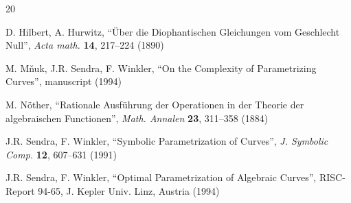 \begin{thebibliography}{20}

      D. Hilbert, A. Hurwitz, ``\"Uber die Diophantischen
Gleichungen vom Geschlecht Null'', {\it Acta math.} {\bf 14},
217--224 (1890)

    M. M\v nuk, J.R. Sendra, F. Winkler, ``On the 
Complexity of Parametrizing Curves'', manuscript (1994)

     M. N\"other, ``Rationale Ausf\"uhrung der Operationen
in der Theorie der algebraischen Functionen'', {\it Math. Annalen}
{\bf 23}, 311--358 (1884)

 J.R. Sendra, F. Winkler, ``Symbolic Parametrization of
Curves'', {\it J. Symbolic Comp.} {\bf 12}, 607--631 (1991)

 J.R. Sendra, F. Winkler, ``Optimal Parametrization of
Algebraic Curves'', RISC-Report 94-65,
J. Kepler Univ. Linz, Austria (1994)

\end{thebibliography}



